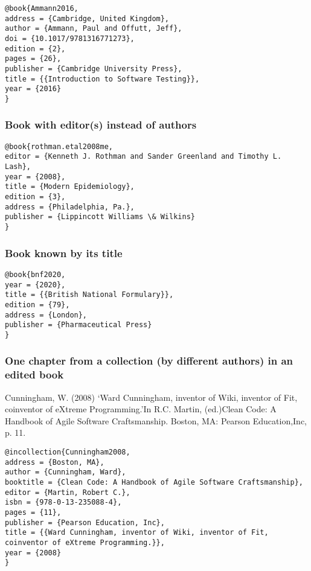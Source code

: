 \documentclass{article}
\begin{document}

\begin{lstlisting}
@book{Ammann2016,
address = {Cambridge, United Kingdom},
author = {Ammann, Paul and Offutt, Jeff},
doi = {10.1017/9781316771273},
edition = {2},
pages = {26},
publisher = {Cambridge University Press},
title = {{Introduction to Software Testing}},
year = {2016}
}
\end{lstlisting}

\subsubsection*{Book with editor(s) instead of authors}


\begin{lstlisting}
@book{rothman.etal2008me,
editor = {Kenneth J. Rothman and Sander Greenland and Timothy L. Lash},
year = {2008},
title = {Modern Epidemiology},
edition = {3},
address = {Philadelphia, Pa.},
publisher = {Lippincott Williams \& Wilkins}
}
\end{lstlisting}

\subsubsection*{Book known by its title}


\begin{lstlisting}
@book{bnf2020,
year = {2020},
title = {{British National Formulary}},
edition = {79},
address = {London},
publisher = {Pharmaceutical Press}
}
\end{lstlisting}

\subsubsection*{One chapter from a collection (by different authors) in an edited book}

Cunningham, W. (2008) ‘Ward Cunningham, inventor of Wiki, inventor of Fit, coinventor of eXtreme Programming.’In R.C. Martin, (ed.)Clean Code: A Handbook of Agile Software Craftsmanship. Boston, MA: Pearson Education,Inc, p. 11.

\begin{lstlisting}
@incollection{Cunningham2008,
address = {Boston, MA},
author = {Cunningham, Ward},
booktitle = {Clean Code: A Handbook of Agile Software Craftsmanship},
editor = {Martin, Robert C.},
isbn = {978-0-13-235088-4},
pages = {11},
publisher = {Pearson Education, Inc},
title = {{Ward Cunningham, inventor of Wiki, inventor of Fit, coinventor of eXtreme Programming.}},
year = {2008}
}
\end{lstlisting}
\end{document}
